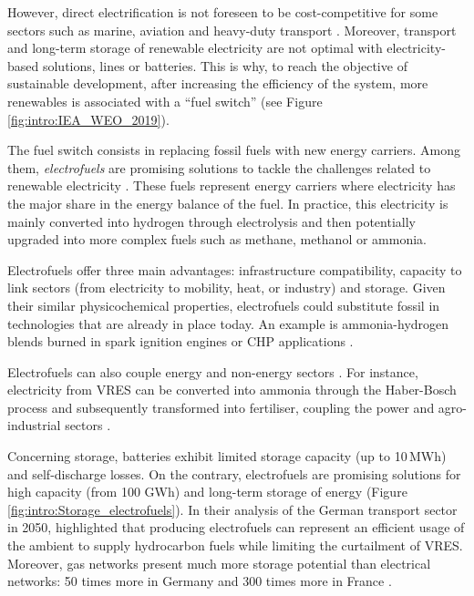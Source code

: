 However, direct electrification is not foreseen to be cost-competitive for some sectors such as marine, aviation and heavy-duty transport \cite{horvath2018techno, brynolf2018,IEA2021}. Moreover, transport and long-term storage of renewable electricity are not optimal with electricity-based solutions,  lines or batteries. This is why, to reach the objective of sustainable development, after increasing the efficiency of the system, more renewables is associated with a ``fuel switch'' (see Figure \ref{fig:intro:IEA_WEO_2019}). 

The fuel switch consists in replacing fossil fuels with new energy carriers.  Among them, \textit{electrofuels} are promising solutions to tackle the challenges related to renewable electricity \cite{rozzi2020}. These fuels represent energy carriers where electricity has the major share in the energy balance of the fuel. In practice, this electricity is mainly converted into hydrogen through electrolysis and then potentially upgraded into more complex fuels such as methane, methanol or ammonia. 

Electrofuels offer three main advantages: infrastructure compatibility, capacity to link sectors (\ie from electricity to mobility, heat, or industry) and storage. Given their similar physicochemical properties, electrofuels could substitute fossil in technologies that are already in place today. An example is ammonia-hydrogen blends burned in spark ignition engines \cite{lhuillier2020experimental} or \gls{CHP} applications \cite{pochet202022}.

Electrofuels can also couple energy and non-energy sectors \cite{Stancin2020}. For instance, electricity from \gls{VRES} can be converted into ammonia through the Haber-Bosch process and subsequently transformed into fertiliser, coupling the power and agro-industrial sectors \cite{verleysen2020can}. 

Concerning storage,  batteries exhibit limited storage capacity (up to 10\,MWh) and self-discharge losses. On the contrary, electrofuels are promising solutions for high capacity (from 100 GWh) and long-term storage of energy \cite{child2018role, dias2020energy} (Figure \ref{fig:intro:Storage_electrofuels}). In their analysis of the German transport sector in 2050, \citet{millinger2021electrofuels} highlighted that producing electrofuels can represent an efficient usage of the ambient  to supply hydrocarbon fuels while limiting the curtailment of \gls{VRES}. Moreover, gas networks present much more storage potential than electrical networks: 50 times more in Germany and 300 times more in France \cite{Rosa2017}. 

